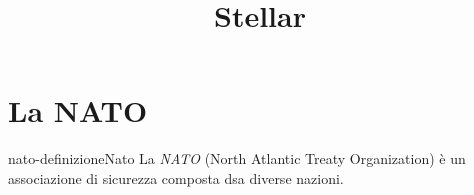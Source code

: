 \documentclass[preview]{standalone}
\begin{document}
\title{Stellar}
\genpage

\section{La NATO}

\begin{snippetdefinition}{nato-definizione}{Nato}
    La \textit{NATO} (North Atlantic Treaty Organization) è un associazione di sicurezza composta dsa diverse nazioni.
\end{snippetdefinition}
\end{document}
